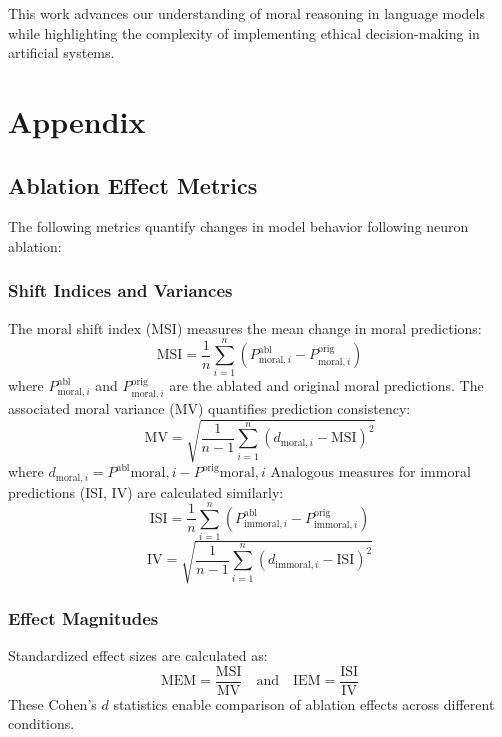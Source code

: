 \documentclass[runninghheads]{llncs}
\begin{document}
This work advances our understanding of moral reasoning in language models while highlighting the complexity of implementing ethical decision-making in artificial systems.





\newpage


\section*{Appendix}
\label{app:metrics}

\subsection*{Ablation Effect Metrics}
The following metrics quantify changes in model behavior following neuron ablation:

\subsubsection*{Shift Indices and Variances}
The moral shift index (MSI) measures the mean change in moral predictions:
$$
\text{MSI} = \frac{1}{n}\sum_{i=1}^{n}(P^{\text{abl}}_{\text{moral},i} - P^{\text{orig}}_{\text{moral},i})
$$
where $P^{\text{abl}}_{\text{moral},i}$ and $P^{\text{orig}}_{\text{moral},i}$ are the ablated and original moral predictions.
The associated moral variance (MV) quantifies prediction consistency:
$$\text{MV} = \sqrt{\frac{1}{n-1}\sum_{i=1}^{n}(d_{\text{moral},i} - \text{MSI})^2}$$
where $d_{\text{moral},i} = P^{\text{abl}}{\text{moral},i} - P^{\text{orig}}{\text{moral},i}$
Analogous measures for immoral predictions (ISI, IV) are calculated similarly:
$$
\text{ISI} = \frac{1}{n}\sum_{i=1}^{n}(P^{\text{abl}}_{\text{immoral},i} - P^{\text{orig}}_{\text{immoral},i})
$$
$$
\text{IV} = \sqrt{\frac{1}{n-1}\sum_{i=1}^{n}(d_{\text{immoral},i} - \text{ISI})^2}
$$

\subsubsection*{Effect Magnitudes}
Standardized effect sizes are calculated as:
$$
\text{MEM} = \frac{\text{MSI}}{\text{MV}} \quad \text{and} \quad \text{IEM} = \frac{\text{ISI}}{\text{IV}}
$$
These Cohen's $d$ statistics enable comparison of ablation effects across different conditions.
\end{document}

